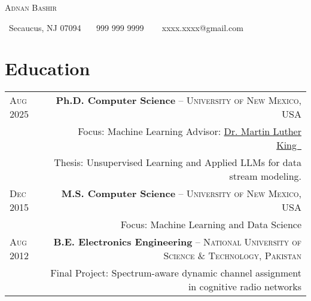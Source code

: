 \documentclass[10pt, letterpaper]{article}
\newcommand{\blueExtArrow}{\textsuperscript{\textcolor{primaryColor}{\tiny \faExternalLink*}}}
\newcommand{\edudate}[1]{\hspace{0.6em}#1}
\newenvironment{header}{\setlength{\topsep}{0pt}\par\kern\topsep\centering\linespread{1.5}}{\par\kern\topsep}
\begin{document}
\newcommand{\ladpulink}{\href{https://github.com/}{Los Alamos Utility Dataset}}
\newcommand{\girasollink}{\href{https://github.com/}{Solar Dataset}}

\begin{header}
    {\fontsize{20pt}{20pt}\selectfont \scshape Adnan Bashir}
\vspace{0.1cm}

    {\color{primaryColor}
        \small
        \faMapMarker*~Secaucus, NJ 07094~\textbar{}~
        \faPhone*~999 999 9999 ~\textbar{}~
        \faEnvelope~xxxx.xxxx@gmail.com~\textbar{}~
        \href{https://www.cs.unm.edu/~abashir/}{\textcolor{primaryColor}{\faLink}}~\blueExtArrow~\textbar{}~
        \href{https://linkedin.com/in/adnaanbashir}{\textcolor{primaryColor}{\faLinkedinIn}}~\blueExtArrow~\textbar{}~
        \href{https://github.com/adbashir}{\textcolor{primaryColor}{\faGithub}}~\blueExtArrow
    }
\end{header}


\section*{Education}
\begin{tabularx}{\textwidth}{@{}L R@{}}
\edudate{\scshape Aug 2025} & \textbf{Ph.D. Computer Science} -- \textsc{University of New Mexico, USA} \\
    & Focus: Machine Learning \textbar{} Advisor: \href{https://www.cs.unm.edu/}{Dr. Martin Luther King~\blueExtArrow} \\
    & Thesis: Unsupervised Learning and Applied LLMs for data stream modeling.  \\[0.5em]

\edudate{\scshape Dec 2015} & \textbf{M.S. Computer Science} -- \textsc{University of New Mexico, USA} \\
         & Focus: Machine Learning and Data Science \\[0.5em]
\edudate{\scshape Aug 2012} & \textbf{B.E. Electronics Engineering} -- \textsc{National University of Science \& Technology, Pakistan} \\
         &  Final Project: Spectrum-aware dynamic channel assignment in cognitive radio networks \\
\end{tabularx}
\end{document}
